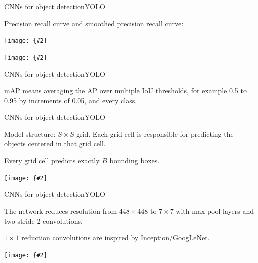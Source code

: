 \documentclass[aspectratio=169]{beamer}
\newcommand{\myfig}[3]{\centerline{\texttt{[image: \{\#2]}}}
\begin{document}
\begin{frame}{CNNs for object detection}{YOLO}

  Precision recall curve and smoothed precision recall curve:
  
  \myfig{2.4in}{pr-curve}{}

  \myfig{1.9in}{pr-curve-smoothed}{\begin{minipage}{4in} \scriptsize{\url{https://medium.com/@jonathan_hui/map-mean-average-precision-for-object-} \url{detection-45c121a31173}} \end{minipage}}

\end{frame}


\begin{frame}{CNNs for object detection}{YOLO}

  mAP means averaging the AP over multiple IoU thresholds, for example
  0.5 to 0.95 by increments of 0.05, and every class.

\end{frame}


\begin{frame}{CNNs for object detection}{YOLO}

  Model structure: $S\times S$ grid. Each grid cell is responsible for
  predicting the objects centered in that grid cell.

  \medskip

  Every grid cell predicts exactly $B$ bounding boxes.

  \medskip

  \myfig{3.0in}{redmon-fig2}{Redmon et al.\ (2016), Fig.\ 2}
  
\end{frame}


\begin{frame}{CNNs for object detection}{YOLO}

  The network reduces resolution from $448\times 448$ to
  $7\times 7$ with max-pool layers and two stride-2 convolutions.

  \medskip

  $1\times 1$ reduction convolutions are inspired by Inception/GoogLeNet.

  \medskip
  
  \myfig{4.5in}{redmon-fig3}{Redmon et al.\ (2016), Fig.\ 3}
  
\end{frame}
\end{document}
